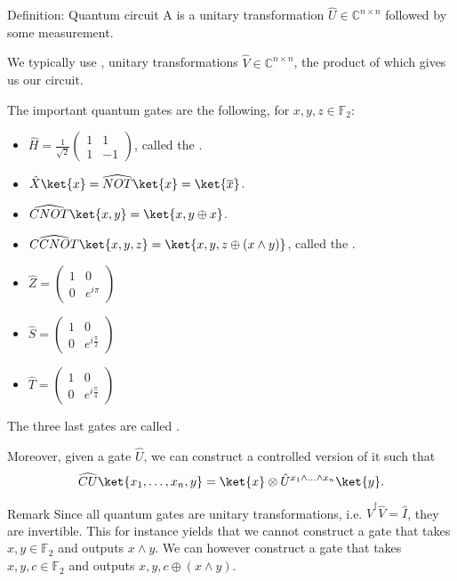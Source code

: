 \documentclass[a4paper]{article}
\begin{document}
\begin{parag}{Definition: Quantum circuit}
    A  is a unitary transformation $\hat{U} \in \mathbb{C}^{n \times n}$ followed by some measurement.

    We typically use , unitary transformations $\hat{V} \in \mathbb{C}^{n \times n}$, the product of which gives us our circuit.

    The important quantum gates are the following, for $x, y, z \in \mathbb{F}_2$:
    \begin{itemize}
        \item $\displaystyle \hat{H} = \frac{1}{\sqrt{2}}\begin{pmatrix} 1 & 1 \\ 1 & -1 \end{pmatrix} $, called the . 
        \item $\displaystyle \hat{X} \ket{x} = \widehat{NOT} \ket{x} = \ket{\bar{x}}$.
        \item $\displaystyle \widehat{CNOT} \ket{x, y} = \ket{x, y \oplus x}$.
        \item $\displaystyle \widehat{CCNOT} \ket{x, y, z} = \ket{x, y, z \oplus \left(x \land y\right)}$, called the .
        \item $\displaystyle \hat{Z} = \begin{pmatrix} 1 & 0 \\ 0 & e^{i \pi} \end{pmatrix} $
        \item $\displaystyle \hat{S} = \begin{pmatrix} 1 & 0 \\ 0 & e^{i \frac{\pi}{2}} \end{pmatrix} $
        \item $\displaystyle \hat{T} = \begin{pmatrix} 1 & 0 \\ 0 & e^{i \frac{\pi}{4}} \end{pmatrix} $
    \end{itemize}

    The three last gates are called .

    Moreover, given a gate $\hat{U}$, we can construct a controlled version of it such that
    \[\widehat{CU} \ket{x_1, \ldots, x_n, y} = \ket{x} \otimes \hat{U}^{x_1 \land \ldots \land x_n} \ket{y}.\]

    \begin{subparag}{Remark}
        Since all quantum gates are unitary transformations, i.e. $\hat{V}^{\dagger} \hat{V} = \hat{I}$, they are invertible. This for instance yields that we cannot construct a gate that takes $x, y \in \mathbb{F}_2$ and outputs $x \land y$. We can however construct a gate that takes $x, y, c \in \mathbb{F}_2$ and outputs $x, y, c \oplus \left(x \land y\right)$.


\end{subparag}
\end{parag}
\end{document}

